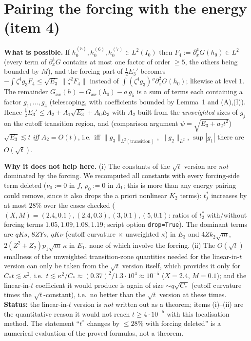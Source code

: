 \documentclass[11pt]{article}
\theoremstyle{remark}\newtheorem{remark}[theorem]{Remark}
\newcommand{\nrm}[1]{\lVert #1\rVert}
\begin{document}
\section{Pairing the forcing with the energy (item 4)}
\textbf{What is possible.} If $h_0^{(5)},h_0^{(6)},h_0^{(7)}\in L^2(I_0)$ then $F_4:=\partial_x^4G(h_0)\in L^2$ (every term of $\partial_x^4G$ contains at most one factor of order $\ge5$, the others being bounded by $M$), and the forcing part of $\frac12E_3'$ becomes $-\int\zeta^4g_3F_4\le\sqrt{E_3}\,\nrm{\zeta^2F_4}$ instead of $\int(\zeta^4g_3)''\partial_x^2G(h_0)$; likewise at level $1$. The remainder $G_{xx}(h)-G_{xx}(h_0)-a\,g_5$ is a sum of terms each containing a factor $g_1,\dots,g_4$ (telescoping, with coefficients bounded by Lemma~1 and (A),(I)). Hence $\frac12E_3'\le A_2+A_1\sqrt{E_3}+A_0E_3$ with $A_2$ built from the \emph{unweighted} sizes of $g_j$ on the cutoff transition region, and (comparison argument $\psi=\sqrt{E_3+a_2t^2}$) $\sqrt{E_3}\lesssim t$ \emph{iff} $A_2=O(t)$, i.e.\ iff $\nrm{g_3}_{L^2(\text{transition})}$, $\nrm{g_2}_{L^2}$, $\sup|g_1|$ there are $O(\sqrt t)$.

\textbf{Why it does not help here.} (i) The constants of the $\sqrt t$ version are \emph{not} dominated by the forcing. We recomputed all constants with every forcing-side term deleted ($\nu_0:=0$ in $f$, $\rho_0:=0$ in $\Lambda_1$; this is more than any energy pairing could remove, since it also drops the a priori nonlinear $K_2$ terms): $t_j^*$ increases by at most $28\%$ over the cases checked ($(X,M)=(2.4,0.1),(2.4,0.3),(3,0.1),(5,0.1)$: ratios of $t_2^*$ with/without forcing terms $1.05,1.09,1.08,1.19$; script option \texttt{drop=True}). The dominant terms are $qK s$, $8ZYs$, $qK\nu$ (cutoff curvature $\times$ unweighted $\kappa$) in $E_3$ and $4Zk_2\sqrt m$, $2(Z^2+Z_2)p_1\sqrt m\,\kappa$ in $E_1$, none of which involve the forcing. (ii) The $O(\sqrt t)$ smallness of the unweighted transition-zone quantities needed for the linear-in-$t$ version can only be taken from the $\sqrt t$ version itself, which provides it only for $C_*t\lesssim\kappa^2$, i.e.\ $t\lesssim\kappa^2/C_*\approx(0.37)^2/1.3\cdot10^4\approx10^{-5}$ ($X=2.4$, $M=0.1$); and the linear-in-$t$ coefficient it would produce is again of size $\sim q\sqrt{C_*}$ (cutoff curvature times the $\sqrt t$-constant), i.e.\ no better than the $\sqrt t$ version at these times.
\textbf{Status:} the linear-in-$t$ version is \emph{not} written out as a theorem; items (i)--(ii) are the quantitative reason it would not reach $t\ge4\cdot10^{-5}$ with this localisation method. The statement ``$t^*$ changes by $\le28\%$ with forcing deleted'' is a numerical evaluation of the proved formulas, not a theorem.
\end{document}
